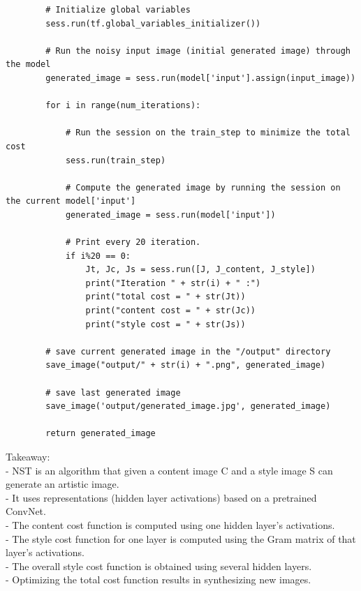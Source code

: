 \documentclass[11pt, a4paper]{article}
\begin{document}
\begin{spacing}{1.1}
\begin{lstlisting}
		# Initialize global variables
		sess.run(tf.global_variables_initializer())
		
		# Run the noisy input image (initial generated image) through the model	
		generated_image = sess.run(model['input'].assign(input_image))
		
		for i in range(num_iterations):
			
			# Run the session on the train_step to minimize the total cost	
			sess.run(train_step)
			
			# Compute the generated image by running the session on the current model['input']
			generated_image = sess.run(model['input'])
			
			# Print every 20 iteration.
			if i%20 == 0:
				Jt, Jc, Js = sess.run([J, J_content, J_style])
				print("Iteration " + str(i) + " :")
				print("total cost = " + str(Jt))
				print("content cost = " + str(Jc))
				print("style cost = " + str(Js))
		
		# save current generated image in the "/output" directory
		save_image("output/" + str(i) + ".png", generated_image)
		
		# save last generated image
		save_image('output/generated_image.jpg', generated_image)
		
		return generated_image \end{lstlisting} \vspace*{1mm}
	Takeaway: \\
	- NST is an algorithm that given a content image C and a style image S can generate an artistic image.\\
	- It uses representations (hidden layer activations) based on a pretrained ConvNet. \\
	- The content cost function is computed using one hidden layer's activations.\\
	- The style cost function for one layer is computed using the Gram matrix of that layer's activations.\\
	- The overall style cost function is obtained using several hidden layers.\\
	- Optimizing the total cost function results in synthesizing new images. \newpage


\end{spacing}
\end{document}
